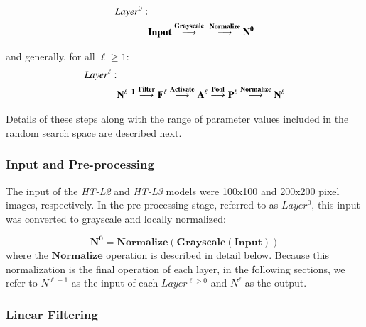 \begin{align*}
Layer^{0}: &\\ &\mathbf{Input}
\buildrel{\mathbf{Grayscale}}\over{\longrightarrow} \mathbf{ }
\buildrel{\mathbf{Normalize}}\over{\longrightarrow} \mathbf{N^{0}} %
\end{align*}

and generally, for all $\ell \ge 1$:
\begin{align*}
Layer^{\ell}: &\\ &\mathbf{N^{\ell - 1}}
\buildrel{\mathbf{Filter}}\over{\longrightarrow} \mathbf{F^{\ell}}
\buildrel{\mathbf{Activate}}\over{\longrightarrow} \mathbf{A^{\ell}}
\buildrel{\mathbf{Pool}}\over{\longrightarrow} \mathbf{P^{\ell}}
\buildrel{\mathbf{Normalize}}\over{\longrightarrow} \mathbf{N^{\ell}}
\end{align*}

Details of these steps along with the range of parameter values included in the
random search space are described next.

\subsubsection{Input and Pre-processing}

The input of the \emph{HT-L2} and \emph{HT-L3} models were 100x100 and 200x200
pixel images, respectively. In the pre-processing stage, referred to as
$Layer^{0}$, this input was converted to grayscale and locally normalized:

\begin{equation}\label{eq:input}
\mathbf{N^{0}=Normalize(Grayscale(Input))}
\end{equation}
where the $\mathbf{Normalize}$ operation is described in detail below.  Because
this normalization is the final operation of each layer, in the following
sections, we refer to $N^{\ell-1}$ as the input of each $Layer^{\ell>0}$ and
$N^{\ell}$ as the output.


\subsubsection{Linear Filtering}

